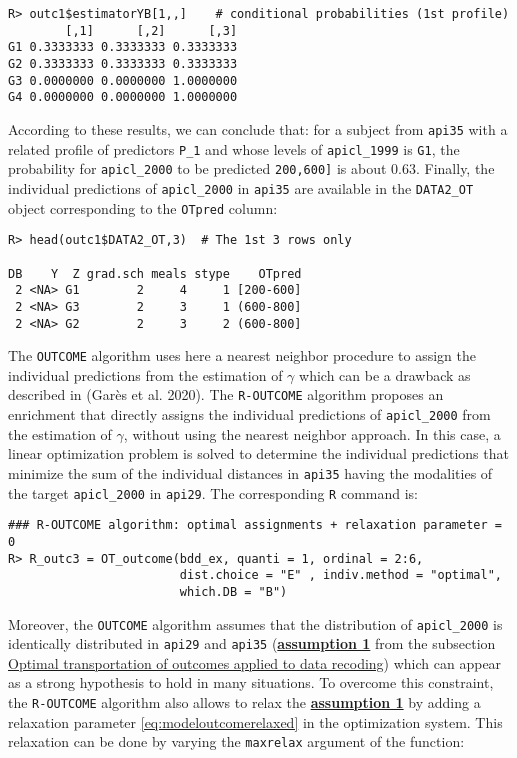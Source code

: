 \begin{verbatim}
R> outc1$estimatorYB[1,,]    # conditional probabilities (1st profile)
        [,1]      [,2]      [,3]
G1 0.3333333 0.3333333 0.3333333
G2 0.3333333 0.3333333 0.3333333
G3 0.0000000 0.0000000 1.0000000
G4 0.0000000 0.0000000 1.0000000
\end{verbatim}

According to these results, we can conclude that: for a subject from \texttt{api35} with a related profile of predictors \texttt{P\_1} and whose levels of \texttt{apicl\_1999} is \texttt{\textquotesingle{}G1\textquotesingle{}}, the probability for \texttt{apicl\_2000} to be predicted \texttt{\textquotesingle{}{[}200,600{]}\textquotesingle{}} is about \(0.63\). Finally, the individual predictions of \texttt{apicl\_2000} in \texttt{api35} are available in the \texttt{DATA2\_OT} object corresponding to the \texttt{OTpred} column:

\begin{verbatim}
R> head(outc1$DATA2_OT,3)  # The 1st 3 rows only

DB    Y  Z grad.sch meals stype    OTpred
 2 <NA> G1        2     4     1 [200-600]
 2 <NA> G3        2     3     1 (600-800]
 2 <NA> G2        2     3     2 (600-800]
\end{verbatim}

The \texttt{OUTCOME} algorithm uses here a nearest neighbor procedure to assign the individual predictions from the estimation of \(\gamma\) which can be a drawback as described in (Garès et al. 2020). The \texttt{R-OUTCOME} algorithm proposes an enrichment that directly assigns the individual predictions of \texttt{apicl\_2000} from the estimation of \(\gamma\), without using the nearest neighbor approach. In this case, a linear optimization problem is solved to determine the individual predictions that minimize the sum of the individual distances in \texttt{api35} having the modalities of the target \texttt{apicl\_2000} in \texttt{api29}. The corresponding \texttt{R} command is:

\begin{verbatim}
### R-OUTCOME algorithm: optimal assignments + relaxation parameter = 0
R> R_outc3 = OT_outcome(bdd_ex, quanti = 1, ordinal = 2:6, 
                        dist.choice = "E" , indiv.method = "optimal",
                        which.DB = "B")
\end{verbatim}

Moreover, the \texttt{OUTCOME} algorithm assumes that the distribution of \texttt{apicl\_2000} is identically distributed in \texttt{api29} and \texttt{api35} (\protect\hyperlink{optt}{\textbf{assumption 1}} from the subsection \protect\hyperlink{optt}{Optimal transportation of outcomes applied to data recoding}) which can appear as a strong hypothesis to hold in many situations. To overcome this constraint, the \texttt{R-OUTCOME} algorithm also allows to relax the \protect\hyperlink{optt}{\textbf{assumption 1}} by adding a relaxation parameter \eqref{eq:modeloutcomerelaxed} in the optimization system. This relaxation can be done by varying the \texttt{maxrelax} argument of the function:

